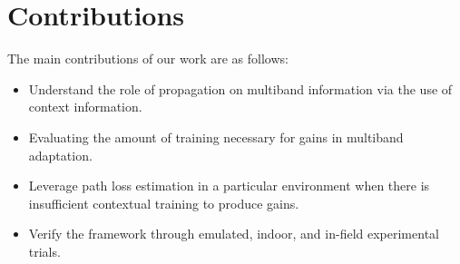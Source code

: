 \section{Contributions}
\label{sec:introduction}


The main contributions of our work are as follows:
\begin{itemize}

\item Understand the role of propagation on multiband information via the use of context information.
\item Evaluating the amount of training necessary for gains in multiband adaptation.
\item Leverage path loss estimation in a particular environment when there is insufficient contextual training
to produce gains.
\item Verify the framework through emulated, indoor, and in-field experimental trials.
\end{itemize}



